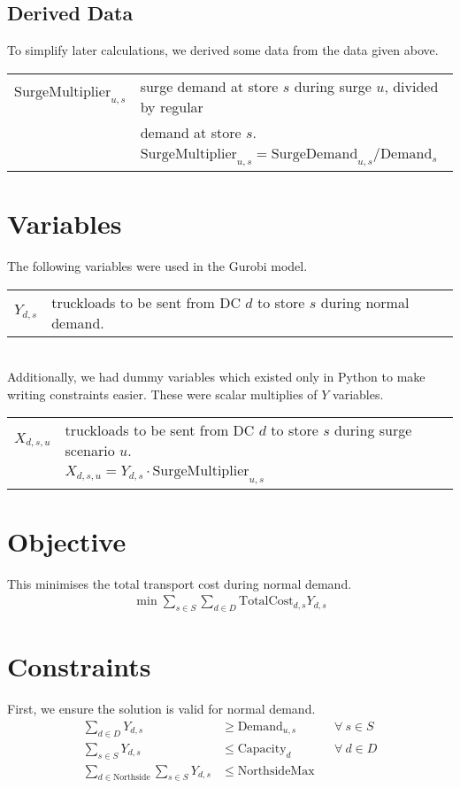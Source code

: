 \documentclass[11pt,a4paper]{article}
\begin{document}
\subsection{Derived Data}
To simplify later calculations, we derived some data from the data given above.\\[0.8em]    
\begin{tabular}{l l}
    $\mathrm{SurgeMultiplier}_{u,s}$ & surge demand at store $s$ during surge $u$,  divided by regular \\ 
    &  demand at store $s$. \\ 
    &$\mathrm{SurgeMultiplier}_{u,s} = \mathrm{SurgeDemand}_{u,s} / \mathrm{Demand}_s $
\end{tabular}

\section{Variables}
The following variables were used in the Gurobi model.\\[0.8em]
\begin{tabular}{l l}
    $Y_{d,s}$ & truckloads to be sent from DC $d$ to store $s$ during normal demand.
\end{tabular}
\\[0.8em]
\noindent Additionally, we had dummy variables which existed only in Python to 
make writing constraints easier. These were scalar multiplies of $Y$ variables.\\[0.8em]
\begin{tabular}{l l}
    $X_{d,s,u}$ & truckloads to be sent from DC $d$ to store $s$ during 
    surge scenario $u$. \\ 
    & $X_{d,s,u} = Y_{d,s} \cdot \mathrm{SurgeMultiplier}_{u,s}$
\end{tabular}

\section{Objective}
This minimises the total transport cost during normal demand.
\begin{align*}
    \min \sum_{s \in S} \sum_{d \in D} \mathrm{TotalCost}_{d, s} Y_{d,s}
\end{align*}

\section{Constraints}
First, we ensure the solution is valid for normal demand.
\begin{align*}
    \sum_{d \in D} Y_{d,s} &\ge \mathrm{Demand}_{u,s} &&\forall~s \in S \\ 
    \sum_{s \in S} Y_{d,s} &\le \mathrm{Capacity}_d &&\forall~d \in D \\ 
    \sum_{d \in \mathrm{Northside}} \sum_{s \in S} Y_{d,s} &\le \mathrm{NorthsideMax}
\end{align*}
\end{document}
